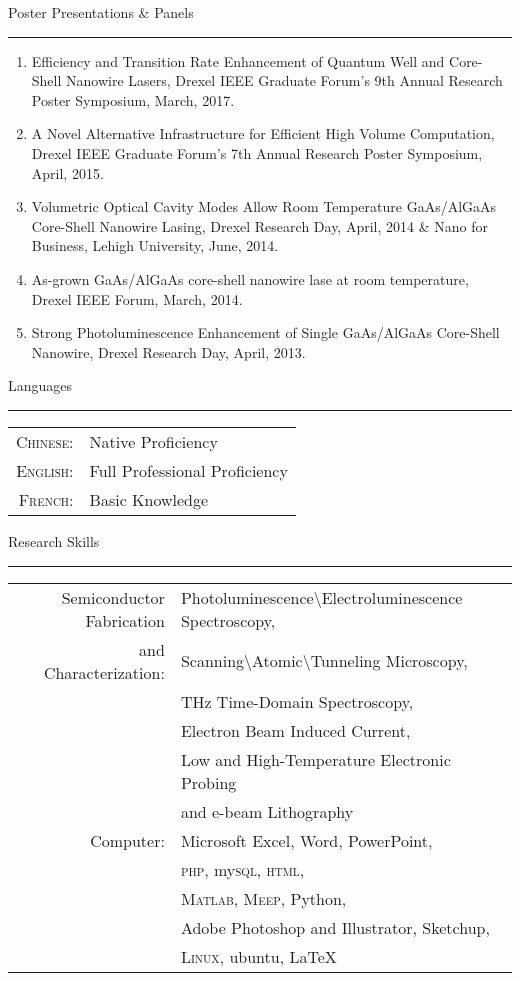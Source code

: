\begin{vita}
{\Large\scshape\raggedright{Poster Presentations \& Panels}}
\newline
\rule{\textwidth}{1pt}
\begin{enumerate}
\item Efficiency and Transition Rate Enhancement of Quantum Well and Core-Shell Nanowire Lasers, Drexel IEEE Graduate Forum’s 9th Annual Research Poster Symposium, March, 2017.
\item A Novel Alternative Infrastructure for Efficient High Volume Computation, Drexel IEEE Graduate Forum’s 7th Annual Research Poster Symposium, April, 2015.
\item Volumetric Optical Cavity Modes Allow Room Temperature GaAs/AlGaAs Core-Shell Nanowire Lasing, Drexel Research Day, April, 2014 \& Nano for Business, Lehigh University, June, 2014.
\item As-grown GaAs/AlGaAs core-shell nanowire lase at room temperature, Drexel IEEE Forum, March, 2014.
\item Strong Photoluminescence Enhancement of Single GaAs/AlGaAs Core-Shell Nanowire, Drexel Research Day, April, 2013.
\end{enumerate}


{\Large\scshape\raggedright{Languages}}
\newline
\rule{\textwidth}{1pt}
\begin{tabular}{rl}
\textsc{Chinese:}&Native Proficiency\\
\textsc{English:}&Full Professional Proficiency\\
\textsc{French:}&Basic Knowledge\\
\end{tabular}


{\Large\scshape\raggedright{Research Skills}}
\newline
\rule{\textwidth}{1pt}
\begin{tabular}{rl}
 Semiconductor Fabrication & Photoluminescence\textbackslash Electroluminescence Spectroscopy, \\
 and Characterization:& Scanning\textbackslash Atomic\textbackslash Tunneling Microscopy, \\
 & THz Time-Domain Spectroscopy,\\
 & Electron Beam Induced Current,\\ 
 & Low and High-Temperature Electronic Probing \\
 & and e-beam Lithography\\
Computer:& Microsoft Excel, Word, PowerPoint, \\
& \textsc{php}, my\textsc{sql}, \textsc{html},  \\
& \textsc{Matlab}, \textsc{Meep}, Python, \\
& Adobe Photoshop and Illustrator, Sketchup, \\ 
& \textsc{Linux}, ubuntu, {\LaTeX}\\
\end{tabular}


\end{vita}
